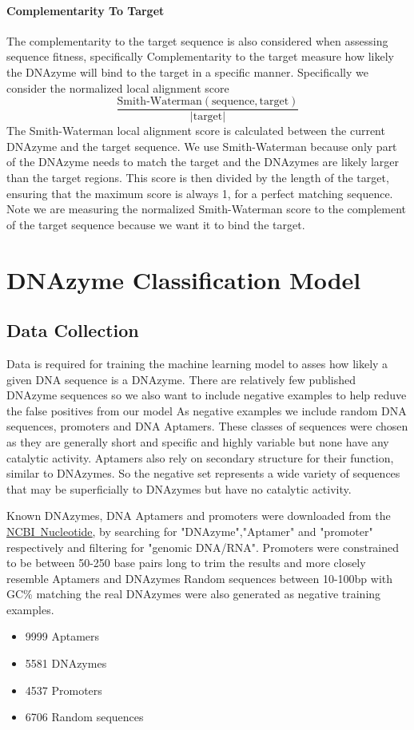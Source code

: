\documentclass[11pt]{article}
\newcommand{\link}[2]{\href{#1}{\color{linkcolor}\setulcolor{linkcolor}\ul{\mbox{#2}}}}
\begin{document}
\paragraph*{\textbf{Complementarity To Target}}
The complementarity to the target sequence is also considered when assessing sequence fitness, specifically
Complementarity to the target measure how likely the DNAzyme will bind to the target in a specific manner.
Specifically we consider the normalized local alignment score
$$\frac{\text{Smith-Waterman}(\text{sequence},\text{target})}{|\text{target}|}$$
The Smith-Waterman local alignment score is calculated between the current DNAzyme and the target sequence.
We use Smith-Waterman because only part of the DNAzyme needs to match the target and the DNAzymes are likely larger than the target regions.
This score is then divided by the length of the target, ensuring that the maximum score is always 1, for a perfect matching sequence.
Note we are measuring the normalized Smith-Waterman score to the complement of the target sequence because we want it to bind the target.



\section*{DNAzyme Classification Model}
\subsection*{Data Collection}
Data is required for training the machine learning model to asses how likely a given DNA sequence is a DNAzyme.
There are relatively few published DNAzyme sequences so we also want to include negative examples to help reduve the false positives from our model
As negative examples we include random DNA sequences, promoters and DNA Aptamers.
These classes of sequences were chosen as they are generally short and specific and highly variable but none have any catalytic activity.
Aptamers also rely on secondary structure for their function, similar to DNAzymes.
So the negative set represents a wide variety of sequences that may be superficially to DNAzymes but have no catalytic activity.
\par
Known DNAzymes, DNA Aptamers and promoters were downloaded from the \link{https://www.ncbi.nlm.nih.gov/nuccore/}{NCBI Nucleotide}, by searching for "DNAzyme","Aptamer" and "promoter" respectively and filtering for "genomic DNA/RNA".
Promoters were constrained to be between 50-250 base pairs long to trim the results and more closely resemble Aptamers and DNAzymes
Random sequences between 10-100bp with GC\% matching the real DNAzymes were also generated as negative training examples.
\begin{itemize}
    \item 9999 Aptamers
    \item 5581 DNAzymes
    \item 4537 Promoters
    \item 6706 Random sequences
\end{itemize}
\end{document}
